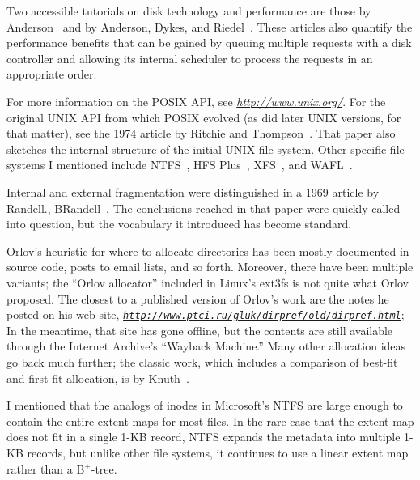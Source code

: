 Two accessible tutorials on disk technology and performance are those
by Anderson~\cite{max1118} and by Anderson, Dykes, and
Riedel~\cite{max1119}.  These articles also quantify the performance
benefits that can be gained by queuing multiple requests with a disk
controller and allowing its internal scheduler to process the requests
in an appropriate order.

For more information on the POSIX API, see
\textit{\url{http://www.unix.org/}}.  For the original UNIX API from which POSIX
evolved (as did later UNIX versions, for that matter), see the 1974
article by Ritchie and Thompson~\cite{jhs2.3}.  That paper also
sketches the internal structure of the initial UNIX file system.
Other specific file systems I mentioned include NTFS~\cite{max981},
HFS Plus~\cite{max1133}, XFS~\cite{max1110}, and WAFL~\cite{max1115}.

Internal and external fragmentation were distinguished in a 1969
article by {Randell., B}Randell~\cite{max1058}.  The conclusions reached in that
paper were quickly called into question, but the vocabulary it
introduced has become standard.

Orlov's heuristic for where to allocate directories has been mostly
documented in source code, posts to email lists, and so forth.
Moreover, there have been multiple variants; the ``Orlov allocator''
included in Linux's ext3fs is not quite what Orlov proposed.  The
closest to a published version of Orlov's work are the notes he posted on
his web site, \textit{\href{http://web.archive.org/web/20080131082712/http://www.ptci.ru/gluk/dirpref/old/dirpref.html}{\nolinkurl{http://www.ptci.ru/gluk/dirpref/old/dirpref.html}}};
In the meantime, that site has gone offline, but the contents are still
available through the Internet Archive's ``Wayback Machine.''
Many other allocation
ideas go back much further; the classic work, which includes a
comparison of best-fit and first-fit allocation, is by
Knuth~\cite{max1138}.

I mentioned that the analogs of inodes in Microsoft's NTFS are large
enough to contain the entire extent maps for most files.  In the rare
case that the extent map does not fit in a single 1-KB record, NTFS
expands the metadata into multiple 1-KB records, but unlike other file
systems, it continues to use a linear extent map rather than a B$^+$-tree.

